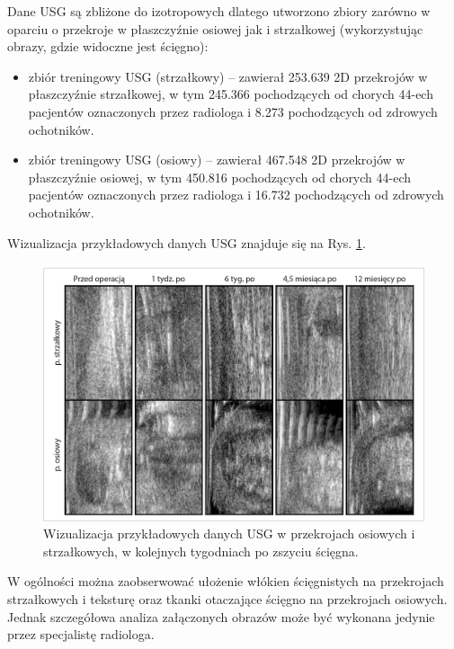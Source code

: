 Dane USG są zbliżone do izotropowych dlatego utworzono zbiory zarówno w oparciu o przekroje w płaszczyźnie osiowej jak i strzałkowej (wykorzystując obrazy, gdzie widoczne jest ścięgno):
\begin{itemize}
	\item zbiór treningowy USG (strzałkowy) -- zawierał 253.639 2D przekrojów w płaszczyźnie strzałkowej, w tym 245.366 pochodzących od chorych 44-ech pacjentów oznaczonych przez radiologa i 8.273 pochodzących od zdrowych ochotników.
	\item zbiór treningowy USG (osiowy) -- zawierał 467.548 2D przekrojów w płaszczyźnie osiowej, w tym 450.816 pochodzących od chorych 44-ech pacjentów oznaczonych przez radiologa i 16.732 pochodzących od zdrowych ochotników. 
\end{itemize}

Wizualizacja przykładowych danych USG znajduje się na Rys. \ref{fig:US_sample}.
\begin{figure}[h!]
	\includegraphics[width=\textwidth]{figures/Data_US_sample.jpg}
	\caption{Wizualizacja przykładowych danych USG w przekrojach osiowych i strzałkowych, w kolejnych tygodniach po zszyciu ścięgna.}
	\label{fig:US_sample}
\end{figure}
W ogólności można zaobserwować ułożenie włókien ścięgnistych na przekrojach strzałkowych i teksturę oraz tkanki otaczające ścięgno na przekrojach osiowych. Jednak szczegółowa analiza załączonych obrazów może być wykonana jedynie przez specjalistę radiologa. 

